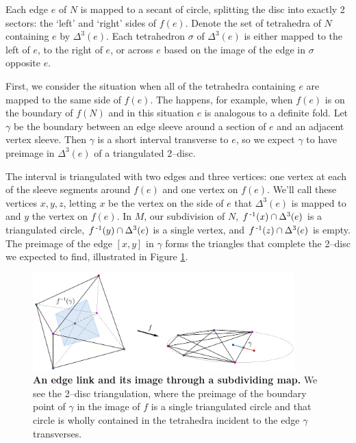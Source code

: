 Each edge $e$ of $N$ is mapped to a secant of circle, splitting the disc into exactly 2 sectors: the `left' and `right' sides of $f(e)$.
Denote the set of tetrahedra of $N$ containing $e$ by $\Delta^3(e)$.
Each tetrahedron $\sigma$ of  $\Delta^3(e)$ is either mapped to the left of $e$, to the right of $e$, or across $e$ based on the image of the edge in $\sigma$ opposite $e$.

First, we consider the situation when all of the tetrahedra containing $e$ are mapped to the same side of $f(e)$.
The happens, for example, when $f(e)$ is on the boundary of $f(N)$ and in this situation $e$ is analogous to a definite fold.
Let $\gamma$ be the boundary between an edge sleeve around a section of $e$ and an adjacent vertex sleeve.
Then $\gamma$ is a short interval transverse to $e$, so we expect $\gamma$ to have preimage in $\Delta^3(e)$ of a triangulated 2--disc.

The interval is triangulated with two edges and three vertices: one vertex at each of the sleeve segments around $f(e)$ and one vertex on $f(e)$.
We'll call these vertices $x,y,z$, letting $x$ be the vertex on the side of $e$ that $\Delta^3(e)$ is mapped to and $y$ the vertex on $f(e)$.
In $M$, our subdivision of $N$, $f^{\,\text{-}1}(x)\cap\Delta^3(e)$ is a triangulated circle, $f^{\,\text{-}1}(y)\cap\Delta^3(e)$ is a single vertex, and $f^{\,\text{-}1}(z)\cap\Delta^3(e)$ is empty.
The preimage of the edge $[x,y]$ in $\gamma$ forms the triangles that complete the 2--disc we expected to find, illustrated in Figure \ref{fig:pl-definite-fold}.

\begin{figure}[h!]
	\centering
	\includegraphics[width=0.9\textwidth]{figures/pl-definite-fold.png}
	\caption{
		\textbf{An edge link and its image through a subdividing map.}
		We see the 2--disc triangulation, where the preimage of the boundary point of $\gamma$ in the image of $f$ is a single triangulated circle and that circle is wholly contained in the tetrahedra incident to the edge $\gamma$ transverses.
	}
	\label{fig:pl-definite-fold}
\end{figure}

